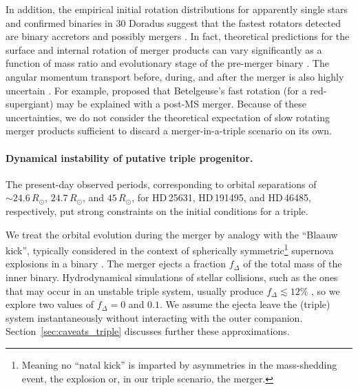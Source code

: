 \documentclass{aa}
\DeclareRobustCommand{\Secref}[1]{Section~\ref{#1}}
\begin{document}
In addition, the empirical initial rotation distributions for apparently
single stars \citep{vfts_2013_otype} and confirmed binaries
\citep{vfts_2015_otype} in 30 Doradus suggest that the fastest
rotators detected are binary accretors \citep[e.g.,][]{packet:81,
  blaauw:93, Renzo_2021} and possibly mergers
\citep[e.g.,][]{deMink_2013}. In fact, theoretical predictions for
the surface and internal rotation of merger products can vary
significantly as a function of mass ratio and evolutionary stage of
the pre-merger binary \citep{chatzopoulos:20, renzo:20c}. The
angular momentum transport before, during, and after the merger is also
highly uncertain \citep[e.g., see discussion in][]{spruit:99,
  spruit:02, fuller:19, denhartogh:20}. For example,
\cite{chatzopoulos:20} proposed that Betelgeuse's fast rotation (for a
red-supergiant) may be explained with a post-MS
merger. Because of these uncertainties, we do not consider the theoretical expectation of slow
rotating merger products sufficient to discard a
merger-in-a-triple scenario on its own.

\paragraph{Dynamical instability of putative triple progenitor.}
The present-day observed periods, corresponding to orbital separations of
$\sim24.6\,R_\odot$, $24.7\,R_\odot$, and $45\,R_\odot$, for HD\,25631, HD\,191495, and HD\,46485,
respectively, put strong constraints on the initial conditions for a
triple.

We treat the orbital evolution during the merger by analogy with the
``Blaauw kick'', typically considered in the context of spherically
symmetric\footnote{Meaning no ``natal kick'' is imparted by
  asymmetries in the mass-shedding event, the explosion or, in our
  triple scenario, the merger.} supernova explosions in a binary
\citep{blaauw:61, boersma:61}. The merger ejects a fraction $f_\Delta$
of the total mass of the inner binary. Hydrodynamical simulations of
stellar collisions, such as the ones that may occur in an unstable
triple system, usually produce $f_\Delta\lesssim 12\%$
\citep[e.g.,][]{lombardi:02, glebbeek:13, renzo:20c, ballone:23}, so
we explore two values of $f_\Delta=0$ and $0.1$. We assume the ejecta
leave the (triple) system instantaneously without interacting with the
outer companion. \Secref{sec:caveats_triple} discusses further these
approximations.
\end{document}
